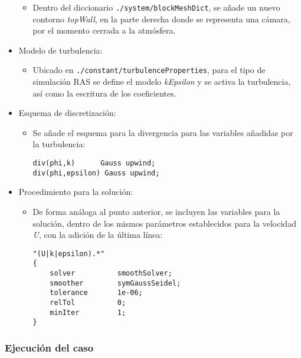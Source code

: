 \begin{itemize}
  \begin{itemize}
  \item
    Dentro del diccionario
    \lstinline[style=bash]{./system/blockMeshDict}, se añade un nuevo
    contorno \emph{topWall}, en la parte derecha donde se representa una
    cámara, por el momento cerrada a la atmósfera.
  \end{itemize}
\item
  Modelo de turbulencia:

  \begin{itemize}
  \item
    Ubicado en \lstinline[style=bash]{./constant/turbulenceProperties},
    para el tipo de simulación RAS se define el modelo \emph{kEpsilon} y
    se activa la turbulencia, así como la escritura de los coeficientes.
  \end{itemize}
\item
  Esquema de discretización:

  \begin{itemize}
  \item
    Se añade el esquema para la divergencia para las variables añadidas
    por la turbulencia:

\begin{lstlisting}[style=c++]
div(phi,k)      Gauss upwind;
div(phi,epsilon) Gauss upwind;
\end{lstlisting}
  \end{itemize}
\item
  Procedimiento para la solución:

  \begin{itemize}
  \item
    De forma análoga al punto anterior, se incluyen las variables para
    la solución, dentro de los mismos parámetros establecidos para la
    velocidad \emph{U}, con la adición de la última línea:

\begin{lstlisting}[style=c++]
"(U|k|epsilon).*"
{
    solver          smoothSolver;
    smoother        symGaussSeidel;
    tolerance       1e-06;
    relTol          0;
    minIter         1;
}
\end{lstlisting}
  \end{itemize}
\end{itemize}

\subsubsection{Ejecución del caso}\label{header-n819}

